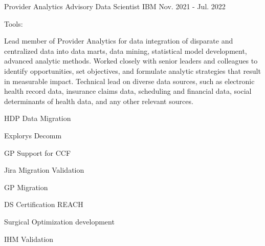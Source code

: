 \begin{cventries}
  \cvexpentry
    {Provider Analytics} %
    {Advisory Data Scientist} %
    {IBM}
    {Nov. 2021 - Jul. 2022}
    {
      \begin{cvheavyparagraph}
        Tools:
      \end{cvheavyparagraph}
    }
    {
      \begin{cvparagraph}
        Lead member of Provider Analytics for data integration of disparate and centralized data into data marts, data mining, statistical model development, advanced analytic methods.  Worked closely with senior leaders and colleagues to identify opportunities, set objectives, and formulate analytic strategies that result in measurable impact.  Technical lead on diverse data sources, such as electronic health record data, insurance claims data, scheduling and financial data, social determinants of health data, and any other relevant sources.
      \end{cvparagraph}
      \begin{cvitems}
        \item {HDP Data Migration}
        \item {Explorys Decomm}
        \item {GP Support for CCF}
        \item {Jira Migration Validation}
        \item {GP Migration}
        \item {DS Certification REACH}
        \item {Surgical Optimization development}
        \item {IHM Validation}
      \end{cvitems}
    }


\end{cventries}
